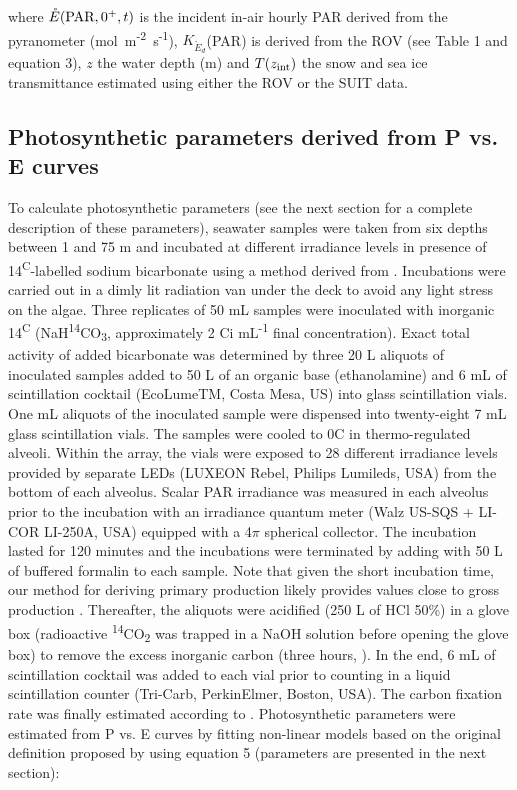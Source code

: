 \documentclass[draft]{agujournal2018}
\newcommand{\kdparscalar}{\ensuremath{K_{\mathring{E}_d}}(\textnormal{PAR})}
\newcommand{\eparzeroscalar}{\ensuremath{\mathring{E}(\textnormal{PAR}, 0^+, t)}}
\newcommand{\micromol}{\textmu mol~m\textsuperscript{-2}~s\textsuperscript{-1}}
\begin{document}
\noindent where \eparzeroscalar{} is the incident in-air hourly PAR derived from the pyranometer (\micromol{}), \kdparscalar{} is derived from the ROV (see Table 1 and equation 3), $z$ the water depth (m) and $T(z_{\textnormal{int}})$ the snow and sea ice transmittance estimated using either the ROV or the SUIT data.

\subsection{Photosynthetic parameters derived from P vs. E curves}

To calculate photosynthetic parameters (see the next section for a complete description of these parameters), seawater samples were taken from six depths between 1 and 75 m and incubated at different irradiance levels in presence of 14\textsuperscript{C}-labelled sodium bicarbonate using a method derived from \citet{Lewis1983}. Incubations were carried out in a dimly lit radiation van under the deck to avoid any light stress on the algae. Three replicates of 50 mL samples were inoculated with inorganic 14\textsuperscript{C} (NaH\textsuperscript{14}CO\textsubscript{3}, approximately 2 \textmu Ci mL\textsuperscript{-1} final concentration). Exact total activity of added bicarbonate was determined by three 20 \textmu L aliquots of inoculated samples added to 50 \textmu L of an organic base (ethanolamine) and 6 mL of scintillation cocktail (EcoLumeTM, Costa Mesa, US) into glass scintillation vials. One mL aliquots of the inoculated sample were dispensed into twenty-eight 7 mL glass scintillation vials. The samples were cooled to 0\textdegree{}C in thermo-regulated alveoli. Within the array, the vials were exposed to 28 different irradiance levels provided by separate LEDs (LUXEON Rebel, Philips Lumileds, USA) from the bottom of each alveolus. Scalar PAR irradiance was measured in each alveolus prior to the incubation with an irradiance quantum meter (Walz US-SQS + LI-COR LI-250A, USA) equipped with a 4$\pi$ spherical collector. The incubation lasted for 120 minutes and the incubations were terminated by adding with 50 \textmu L of buffered formalin to each sample. Note that given the short incubation time, our method for deriving primary production likely provides values close to gross production \citep{Lewis1983}. Thereafter, the aliquots were acidified (250 \textmu L of HCl 50\%) in a glove box (radioactive \textsuperscript{14}CO\textsubscript{2} was trapped in a NaOH solution before opening the glove box) to remove the excess inorganic carbon (three hours, \citet{Knap1996}). In the end, 6 mL of scintillation cocktail was added to each vial prior to counting in a liquid scintillation counter (Tri-Carb, PerkinElmer, Boston, USA). The carbon fixation rate was finally estimated according to \citet{Parsons1984}. Photosynthetic parameters were estimated from P vs. E curves by fitting non-linear models based on the original definition proposed by \citet{Platt1980} using equation 5 (parameters are presented in the next section): 
\end{document}
